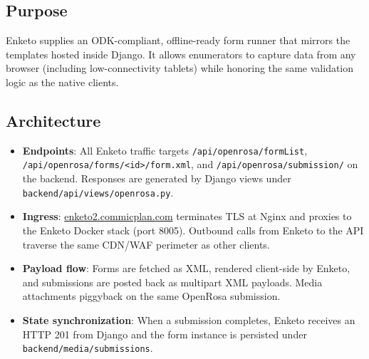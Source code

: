 \documentclass[11pt]{article}
\begin{document}
\subsection{Purpose}
Enketo supplies an ODK-compliant, offline-ready form runner that mirrors the templates hosted inside Django. It allows enumerators to capture data from any browser (including low-connectivity tablets) while honoring the same validation logic as the native clients.

\subsection{Architecture}
\begin{itemize}[leftmargin=*]
  \item \textbf{Endpoints}: All Enketo traffic targets \texttt{/api/openrosa/formList}, \texttt{/api/openrosa/forms/<id>/form.xml}, and \texttt{/api/openrosa/submission/} on the backend. Responses are generated by Django views under \texttt{backend/api/views/openrosa.py}.
  \item \textbf{Ingress}: \href{https://enketo2.commicplan.com}{enketo2.commicplan.com} terminates TLS at Nginx and proxies to the Enketo Docker stack (port 8005). Outbound calls from Enketo to the API traverse the same CDN/WAF perimeter as other clients.
  \item \textbf{Payload flow}: Forms are fetched as XML, rendered client-side by Enketo, and submissions are posted back as multipart XML payloads. Media attachments piggyback on the same OpenRosa submission.
  \item \textbf{State synchronization}: When a submission completes, Enketo receives an HTTP 201 from Django and the form instance is persisted under \texttt{backend/media/submissions}.
\end{itemize}
\end{document}
